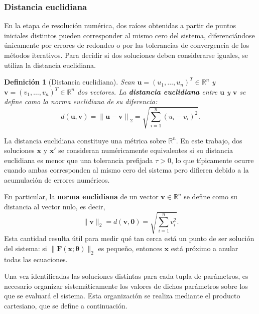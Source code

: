 \documentclass{article}
\newtheorem{definition}{Definición}
\newcommand{\xvec}{\mathbf{x}}
\newcommand{\R}{\mathbb{R}}
\newcommand{\norm}[1]{\left\lVert#1\right\rVert}
\begin{document}
\subsubsection{Distancia euclidiana}

En la etapa de resolución numérica, dos raíces obtenidas a partir de puntos iniciales distintos pueden corresponder al mismo cero del sistema, diferenciándose únicamente por errores de redondeo o por las tolerancias de convergencia de los métodos iterativos. Para decidir si dos soluciones deben considerarse iguales, se utiliza la distancia euclidiana.

\begin{definition}[Distancia euclidiana] Sean \(\mathbf{u} = (u_1, \dots, u_n)^T \in \R^n\) y \(\mathbf{v} = (v_1, \dots, v_n)^T \in \R^n\) dos vectores. La \textbf{distancia euclidiana} entre \(\mathbf{u}\) y \(\mathbf{v}\) se define como la norma euclidiana de su diferencia: \begin{equation} d(\mathbf{u}, \mathbf{v}) = \norm{\mathbf{u} - \mathbf{v}}_2 = \sqrt{\sum_{i=1}^{n} (u_i - v_i)^2}. \end{equation} \end{definition}

La distancia euclidiana constituye una métrica sobre \(\R^n\). En este trabajo, dos soluciones \(\xvec\) y \(\xvec'\) se consideran numéricamente equivalentes si su distancia euclidiana es menor que una tolerancia prefijada \(\tau > 0\), lo que típicamente ocurre cuando ambas corresponden al mismo cero del sistema pero difieren debido a la acumulación de errores numéricos.

En particular, la \textbf{norma euclidiana} de un vector \(\mathbf{v}\in\R^n\) se define como su distancia al vector nulo, es decir, \begin{equation} \|\mathbf{v}\|_2 = d(\mathbf{v}, \mathbf{0}) = \sqrt{\sum_{i=1}^{n} v_i^2}. \label{eq:norma_euclidiana} \end{equation} Esta cantidad resulta útil para medir qué tan cerca está un punto de ser solución del sistema: si \(\|\mathbf{F}(\mathbf{x}; \boldsymbol{\theta})\|_2\) es pequeño, entonces \(\mathbf{x}\) está próximo a anular todas las ecuaciones.

Una vez identificadas las soluciones distintas para cada tupla de parámetros, es necesario organizar sistemáticamente los valores de dichos parámetros sobre los que se evaluará el sistema. Esta organización se realiza mediante el producto cartesiano, que se define a continuación.
\end{document}
